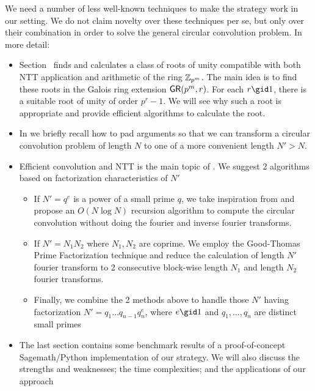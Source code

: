 We need a number of less well-known techniques to make the strategy work in our setting. We do not claim novelty over these techniques per se, but only over their combination in order to solve the general circular convolution problem. In more detail:
\begin{itemize}
    \item Section~ finds and calculates a class of roots of unity compatible with both NTT application and arithmetic of the ring \(\mathbb{Z}_{p^m}\). The main idea is to find these roots in the Galois ring extension \(\mathsf{GR}(p^m, r)\). For each \(r \gid 1\), there is a suitable root of unity of order \(p^r - 1\). We will see why such a root is appropriate and provide efficient algorithms to calculate the root.
    \item In  we briefly recall how to pad arguments so that we can transform a circular convolution problem of length \(N\) to one of a more convenient length \(N' > N\).
    \item Efficient convolution and NTT is the main topic of . We suggest 2 algorithms based on factorization characteristics of \(N'\)
    \begin{itemize}
        \item If \(N' = q^e\) is a power of a small prime \(q\), we take inspiration from  and propose an \(O(N \log N)\) recursion algorithm to compute the circular convolution without doing the fourier and inverse fourier transforms.
        \item If \(N' = N_1 N_2\) where \(N_1, N_2\) are coprime. We employ the Good-Thomas Prime Factorization technique  and reduce the calculation of length \(N'\) fourier transform to 2 consecutive block-wise length \(N_1\) and length \(N_2\) fourier transforms.
        \item Finally, we combine the 2 methods above to handle those \(N'\) having factorization \(N' = q_1 \ldots q_{n-1} q_n^e\), where \(e \gid 1\) and \(q_1, \ldots, q_n\) are distinct small primes
    \end{itemize}
    \item The last section contains some benchmark results of a proof-of-concept Sagemath/Python implementation of our strategy. We will also discuss the strengths and weaknesses; the time complexities; and the applications of our approach
\end{itemize}

